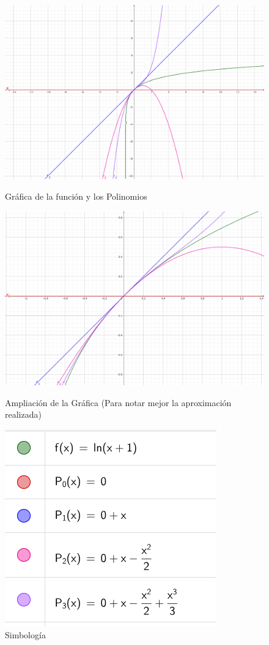 \begin{figure}
    \centering
    \includegraphics[height = 0.25\textheight]{recursos/polinomios/30.png}\par
    \caption*{Gráfica de la función y los Polinomios}
    \includegraphics[height = 0.25\textheight]{recursos/polinomios/30zoom.png}\par
    \caption*{Ampliación de la Gráfica (Para notar mejor la aproximación realizada)}
    \includegraphics[height = 0.25\textheight]{recursos/polinomios/30Leyenda.png}\par
    \caption*{Simbología}
\end{figure}